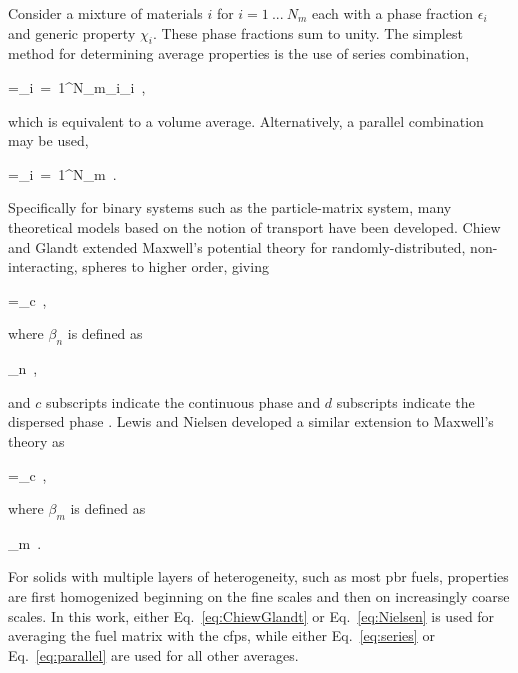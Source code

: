 Consider a mixture of materials \(i\) for \(i=1\ ...\ N_m\) each with a phase fraction \(\epsilon_i\) and generic property \(\chi_i\). These phase fractions sum to unity. The simplest method for determining average properties is the use of series combination,

\beq
\label{eq:series}
\chi=\sum_{i\ =\ 1}^{N_m}\epsilon_i\chi_i\ ,
\eeq

\noindent which is equivalent to a volume average. Alternatively, a parallel combination may be used,

\beq
\label{eq:parallel}
=\sum_{i\ =\ 1}^{N_m}\ .
\eeq

\noindent Specifically for binary systems such as the particle-matrix system, many theoretical models based on the notion of transport have been developed. Chiew and Glandt extended Maxwell's potential theory for randomly-distributed, non-interacting, spheres \cite{progelhof} to higher order, giving

\beq
\label{eq:ChiewGlandt}
\chi=\chi_c\ ,
\eeq

\noindent where \(\beta_n\) is defined as

\beq
\label{eq:betanDef}
\beta_n\equiv{}\ ,
\eeq

\noindent and \(c\) subscripts indicate the continuous phase and \(d\) subscripts indicate the dispersed phase \cite{kamalpour,liu,gonzo,folsom}. Lewis and Nielsen developed a similar extension to Maxwell's theory as \cite{nielsen,progelhof}

\beq
\label{eq:Nielsen}
\chi=\chi_c\ ,
\eeq

\noindent where \(\beta_m\) is defined as

\beq
\label{eq:BmDef}
\beta_m\equiv{}\ .
\eeq

\noindent For solids with multiple layers of heterogeneity, such as most \gls{pbr} fuels, properties are first homogenized beginning on the fine scales and then on increasingly coarse scales. In this work, either Eq.\ \eqref{eq:ChiewGlandt} or Eq.\ \eqref{eq:Nielsen} is used for averaging the fuel matrix with the \glspl{cfp}, while either Eq.\ \eqref{eq:series} or Eq.\ \eqref{eq:parallel} are used for all other averages. 

